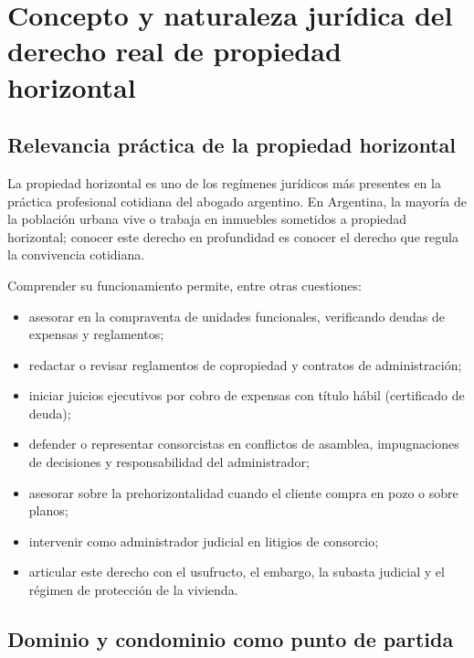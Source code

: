 \documentclass[12pt,oneside]{book}
\begin{document}
\chapter[Concepto y naturaleza jurídica]{Concepto y naturaleza jurídica del derecho real de propiedad horizontal}

\section{Relevancia práctica de la propiedad horizontal}

La propiedad horizontal es uno de los regímenes jurídicos más presentes en la práctica profesional cotidiana del abogado argentino. En Argentina, la mayoría de la población urbana vive o trabaja en inmuebles sometidos a propiedad horizontal; conocer este derecho en profundidad es conocer el derecho que regula la convivencia cotidiana.

Comprender su funcionamiento permite, entre otras cuestiones:

\begin{itemize}
    \item asesorar en la compraventa de unidades funcionales, verificando deudas de expensas y reglamentos;
    \item redactar o revisar reglamentos de copropiedad y contratos de administración;
    \item iniciar juicios ejecutivos por cobro de expensas con título hábil (certificado de deuda);
    \item defender o representar consorcistas en conflictos de asamblea, impugnaciones de decisiones y responsabilidad del administrador;
    \item asesorar sobre la prehorizontalidad cuando el cliente compra en pozo o sobre planos;
    \item intervenir como administrador judicial en litigios de consorcio;
    \item articular este derecho con el usufructo, el embargo, la subasta judicial y el régimen de protección de la vivienda.
\end{itemize}

\section{Dominio y condominio como punto de partida}
\end{document}

